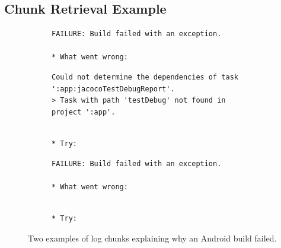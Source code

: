 \subsection{Chunk Retrieval Example}
\label{sec:crt-example}

\begin{figure}[tbp]
  \centering
\begin{subfigure}[tbp]{\columnwidth}
  \begin{lstlisting}[breaklines=true,frame=tlr]
FAILURE: Build failed with an exception.

* What went wrong:
  \end{lstlisting}
  \vspace{-\baselineskip}
  \begin{lstlisting}[backgroundcolor=\color{Cerulean!60},breaklines=true,frame=rl]
Could not determine the dependencies of task ':app:jacocoTestDebugReport'.
> Task with path 'testDebug' not found in project ':app'.
  \end{lstlisting}
  \vspace{-\baselineskip}
  \begin{lstlisting}[breaklines=true,frame=blr]

* Try:
  \end{lstlisting}
\end{subfigure}\hspace{\fill}
\begin{subfigure}[tbp]{\columnwidth}
  \centering
  \begin{lstlisting}[breaklines=true,frame=tlr]
FAILURE: Build failed with an exception.

* What went wrong:
  \end{lstlisting}
  \vspace{-\baselineskip}
  
  \vspace{-\baselineskip}
  \begin{lstlisting}[breaklines=true,frame=blr]

* Try:
  \end{lstlisting}
\end{subfigure}
  \caption{Two examples of log chunks explaining why an Android
  build failed.}
  \label{lst:chunk-example}
\end{figure}

